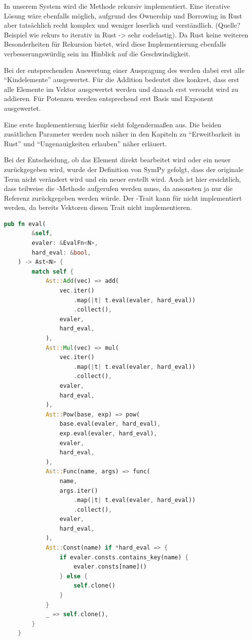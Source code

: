 \documentclass[11pt,a4paper, ngerman]{article}
\begin{document}
In unserem System wird die Methode rekursiv implementiert. Eine iterative Lösung wäre ebenfalls möglich, aufgrund des Ownership und Borrowing in Rust aber tatsächlich recht komplex und weniger leserlich und verständlich. (Quelle? Beispiel wie rekurs to iterativ in Rust -> sehr codelastig). Da Rust keine weiteren Besonderheiten für Rekursion bietet, wird diese Implementierung ebenfalls verbesserungswürdig sein im Hinblick auf die Geschwindigkeit.

Bei der entsprechenden Auswertung einer Auspragung des  werden dabei erst alle ``Kindelemente'' ausgewertet. Für die Addition bedeutet dies konkret, dass erst alle Elemente im Vektor ausgewertet werden und danach erst versucht wird zu addieren. Für Potenzen werden entsprechend erst Basis und Exponent ausgewertet.

Eine erste Implementierung hierfür sieht folgendermaßen aus. Die beiden zusätlichen Parameter werden noch näher in den Kapiteln zu ``Erweitbarkeit in Rust'' und ``Ungenauigkeiten erlauben'' näher erläuert.

Bei der Entscheidung, ob das Element direkt bearbeitet wird oder ein neuer  zurückgegeben wird, wurde der Definition von SymPy gefolgt, dass der originale Term nicht verändert wird und ein neuer erstellt wird. Auch ist hier ersichtlich, dass teilweise die -Methode aufgerufen werden muss, da ansonsten ja nur die Referenz  zurückgegeben werden würde. Der -Trait kann für  nicht implementiert werden, da bereits Vektoren diesen Trait nicht implementieren.

\begin{lstlisting}[language=rust, caption={eval-Methode 1. Implementierung}]
pub fn eval(
        &self,
        evaler: &EvalFn<N>,
        hard_eval: &bool,
    ) -> Ast<N> {
        match self {
            Ast::Add(vec) => add(
                vec.iter()
                    .map(|t| t.eval(evaler, hard_eval))
                    .collect(),
                evaler,
                hard_eval,
            ),
            Ast::Mul(vec) => mul(
                vec.iter()
                    .map(|t| t.eval(evaler, hard_eval))
                    .collect(),
                evaler,
                hard_eval,
            ),
            Ast::Pow(base, exp) => pow(
                base.eval(evaler, hard_eval),
                exp.eval(evaler, hard_eval),
                evaler,
                hard_eval,
            ),
            Ast::Func(name, args) => func(
                name,
                args.iter()
                    .map(|t| t.eval(evaler, hard_eval))
                    .collect(),
                evaler,
                hard_eval,
            ),
            Ast::Const(name) if *hard_eval => {
                if evaler.consts.contains_key(name) {
                    evaler.consts[name]()
                } else {
                    self.clone()
                }
            }
            _ => self.clone(),
        }
    }
\end{lstlisting}
\end{document}
